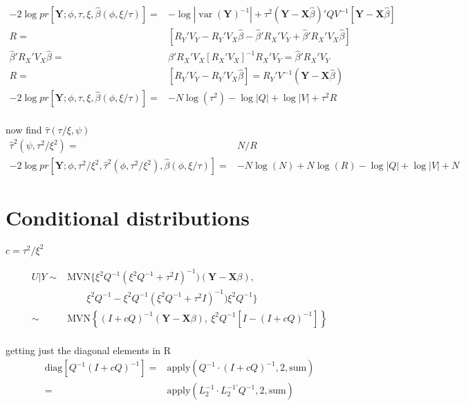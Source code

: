 \documentclass[12pt]{article}
\DeclareMathOperator{\var}{var}
\begin{document}
\begin{align*}
-2 \log pr[\mathbf{Y};\phi,\tau, \xi ,\hat\beta(\phi, \xi/\tau)] = &
-\log |\var(\mathbf{Y})^{-1}| + \tau^2 ( \mathbf{Y} -\mathbf{X}\hat\beta) '
  Q V^{-1} 
 [\mathbf{Y} - \mathbf{X}\hat\beta ] \\
R=&  [R_Y' V_Y - R_Y' V_X \hat\beta - \hat\beta ' R_X' V_Y + \hat\beta 'R_X'
V_X \hat\beta ] \\
\hat\beta 'R_X'
V_X \hat\beta = &  \hat\beta' R_X' V_X [ R_X' V_X ]^{-1}  R_X' V_Y =
 \hat\beta ' R_X' V_Y   \\
R = &[R_Y' V_Y - R_Y' V_X \hat\beta] = R_Y' V^{-1} ( \mathbf{Y} -
\mathbf{X}\hat\beta)\\
-2 \log pr[\mathbf{Y};\phi,\tau, \xi ,\hat\beta(\phi, \xi/\tau)] =& -N \log (\tau^2) -\log|Q| + \log|V| +  \tau^2 R\\
\end{align*}

now find $\hat\tau(\tau/\xi, \psi)$
\begin{align*}
\hat\tau^2(\psi, \tau^2/\xi^2) = &  N/R \\
-2 \log pr[\mathbf{Y};\phi,\tau^2/\xi^2, \hat\tau^2(\phi, \tau^2/\xi^2), \hat\beta(\phi, \xi/\tau)] = & -N\log(N) + N \log (R)   -\log|Q| +
\log|V|+N
\end{align*}

\section*{Conditional distributions}

$c = \tau^2/\xi^2$

\begin{align*}
U|Y \sim & \text{MVN}\{\xi^2Q^{-1}(\xi^2 Q^{-1} + \tau^2 I)^{-1})
(\mathbf{Y} - \mathbf{X}\beta), \\
&\qquad
\xi^2Q^{-1}- \xi^2Q^{-1}( \xi^2Q^{-1} + \tau^2 I  )^{-1})\xi^2 Q^{-1} \}\\
\sim &\text{MVN}\left\{  ( I + c Q  )^{-1}  (\mathbf{Y} -
\mathbf{X}\beta),\ \xi^2 Q^{-1}[I- ( I + cQ  )^{-1}	 ] \right\}\\
\end{align*}

getting just the diagonal elements in R
\begin{align*}
\text{diag}\left[Q^{-1} ( I + c Q  )^{-1}\right]	= &
\text{apply}(Q^{-1} \cdot
( I + c Q  )^{-1}, 2,\text{sum})\\
= & \text{apply}(L_2^{-1}\cdot L_2^{-1\prime}Q^{-1},2,\text{sum})
\end{align*}
\end{document}
